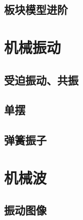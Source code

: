 \documentclass[cn,blue,11pt,normal]{elegantnote}
\begin{document}
\subsection{板块模型进阶}
\begin{proset}
	
\end{proset}
\begin{proset}
	
\end{proset}



\newpage
\section{机械振动}


\subsection{受迫振动、共振}
\begin{proset}
	
\end{proset}

\subsection{单摆}
\begin{proset}
	
\end{proset}
\begin{proset}
	
\end{proset}

\subsection{弹簧振子}
\begin{proset}
	
\end{proset}
\begin{proset}
	
\end{proset}
\begin{proset}
	
\end{proset}
\section{机械波}
\subsection{振动图像}
\begin{proset}
	
\end{proset}
\begin{proset}
	
\end{proset}
\begin{proset}
	
\end{proset}
\end{document}
